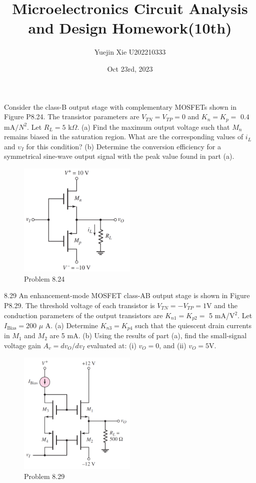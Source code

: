 \documentclass[a4paper,11pt,UTF8]{article}
\title{Microelectronics Circuit Analysis and Design Homework(10th)}
\author{Yuejin Xie \quad U202210333}
\date{Oct 23rd, 2023}
\begin{document}
 Consider the class-B output stage with complementary MOSFETs shown in Figure P8.24. The transistor parameters are $V_{TN}=V_{TP}=0$ and $K_n=K_p=$ $0.4$mA$/N^2$. Let $R_L=5$ k$\Omega$. (a) Find the maximum output voltage such that $M_n$ remains biased in the saturation region. What are the corresponding values of $i_L$ and $\upsilon_I$ for this condition? (b) Determine the conversion efficiency for a symmetrical sine-wave output signal with the peak value found in part (a).
\begin{figure}[H]
	\centering
	\includegraphics[width=0.5\textwidth]{8.24}
	\caption{Problem 8.24}
\end{figure}
8.29 An enhancement-mode MOSFET class-AB output stage is shown in Figure P8.29. The threshold voltage of each transistor is $V_{TN}=-V_{TP}=1$V and the conduction parameters of the output transistors are $K_{n1}=K_{p2}=$
5 mA/V$^{2}$. Let $I_{\text{Bias}}=200$ $\mu$ A. (a) Determine $K_{n3}=K_{p4}$ such that the quiescent drain currents in $M_1$ and $M_2$ are 5 mA. (b) Using the results of part (a), find the small-signal voltage gain $A_v=dv_O/dv_I$ evaluated at: (i) $v_O=0$, and (ii) $v_O=5$V.
\begin{figure}[H]
	\centering
	\includegraphics[width=0.5\textwidth]{8.29}
	\caption{Problem 8.29}
\end{figure}
\end{document}

